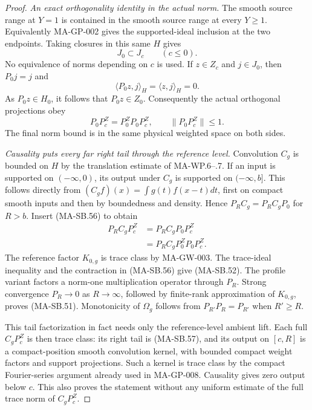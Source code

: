 \begin{proof}
\emph{An exact orthogonality identity in the actual norm.}
The smooth source range at $Y=1$ is contained in
the smooth source range at every $Y\ge1$.
Equivalently MA-GP-002 gives the supported-ideal
inclusion at the two endpoints.  Taking closures
in this same $H$ gives
\[
                         J_0\subset J_c\qquad(c\le0).
 \tag{MA-SB.55}
\]
No equivalence of norms depending on $c$ is used.
If $z\in Z_c$ and $j\in J_0$, then $P_0j=j$ and
\[
              \langle P_0z,j\rangle_H
                 =\langle z,j\rangle_H=0.
\]
As $P_0z\in H_0$, it follows that $P_0z\in Z_0$.
Consequently the actual orthogonal projections obey
\[
                  P_0P_c^Z=P_0^ZP_0P_c^Z,
                     \qquad\|P_0P_c^Z\|\le1.
 \tag{MA-SB.56}
\]
The final norm bound is in the same physical weighted
space on both sides.

\emph{Causality puts every far right tail through the reference level.}
Convolution $C_g$ is bounded on $H$ by the translation
estimate of MA-WP.6--.7.  If an input is supported
on $(-\infty,0)$, its output under $C_g$ is supported
on $(-\infty,b]$.  This follows directly from
$(C_gf)(x)=\int g(t)f(x-t)dt$, first on compact
smooth inputs and then by boundedness and density.
Hence $P_RC_g=P_RC_gP_0$ for $R>b$.
Insert (MA-SB.56) to obtain
\[
 \begin{split}
 P_RC_gP_c^Z
   &=P_RC_gP_0P_c^Z\\
   &=P_RC_gP_0^ZP_0P_c^Z .
 \end{split}
 \tag{MA-SB.57}
\]
The reference factor $K_{0,g}$ is trace class by
MA-GW-003.  The trace-ideal inequality and the
contraction in (MA-SB.56) give (MA-SB.52).
The profile variant factors a norm-one multiplication
operator through $P_R$.
Strong convergence $P_R\to0$ as $R\to\infty$,
followed by finite-rank approximation of $K_{0,g}$,
proves (MA-SB.51).  Monotonicity of $\Omega_g$ follows
from $P_{R'}P_R=P_{R'}$ when $R'\ge R$.

This tail factorization in fact needs only the
reference-level ambient lift.  Each full
$C_gP_c^Z$ is then trace class: its right tail
is (MA-SB.57), and its output on $[c,R]$ is
a compact-position smooth convolution kernel,
with bounded compact weight factors and support
projections.  Such a kernel is trace class by
the compact Fourier-series argument already
used in MA-GP-008.  Causality gives zero output
below $c$.  This also proves the statement
without any uniform estimate of the full
trace norm of $C_gP_c^Z$.


\end{proof}
